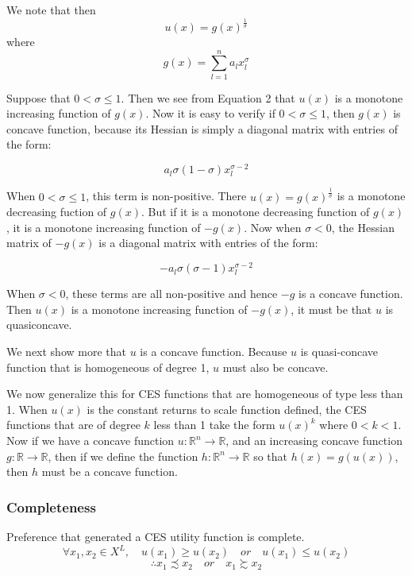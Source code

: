 We note that then
\begin{equation}
u(x)=g(x)^{\frac{1}{\sigma}}
\end{equation}
where
\begin{equation}
g(x)=\sum\limits_{l=1}^{n} a_{l} x_{l}^{\sigma}
\end{equation}

Suppose that $0<\sigma\leq1$. Then we see from Equation 2 that $u(x)$ is a monotone increasing function of $g(x)$. Now it is easy to verify if $0<\sigma\leq1$, then $g(x)$ is concave function, because its Hessian is simply a diagonal matrix with entries of the form:

\begin{equation}
a_{l}\sigma(1-\sigma)x_{l}^{\sigma-2}
\end{equation}

When $0<\sigma\leq1$, this term is non-positive. There $u(x) = g(x)^{\frac{1}{\sigma}}$ is a monotone decreasing fuction of $g(x)$. But if it is a monotone decreasing function of $g(x)$, it is a monotone increasing function of $-g(x)$. Now when $\sigma<0$, the Hessian matrix of $-g(x)$ is a diagonal matrix with entries of the form:

\begin{equation}
-a_{l}\sigma(\sigma-1)x_l^{\sigma-2}
\end{equation}

When $\sigma<0$, these terms are all non-positive and hence $-g$ is a concave function. Then $u(x)$ is a monotone increasing function of $-g(x)$, it must be that $u$ is quasiconcave.

We next show more that $u$ is a concave function. Because $u$ is quasi-concave function that is homogeneous of degree 1, $u$ must also be concave.

We now generalize this for CES functions that are homogeneous of type less than 1. When $u(x)$ is the constant returns to scale function defined, the CES functions that are of degree $k$ less than 1 take the form $u(x)^{k}$ where $0 < k < 1$. Now if we have a concave function $u: \mathbb{R}^{n} \rightarrow \mathbb{R}$, and an increasing concave function $g: \mathbb{R} \rightarrow \mathbb{R}$, then if we define the function $h: \mathbb{R}^n \rightarrow \mathbb{R}$ so that $h(x) = g(u(x))$, then $h$ must be a concave function.

\subsubsection{Completeness}
Preference that generated a CES utility function is complete.
$$\forall x_1, x_2 \in X^L, \quad u(x_1)\geq u(x_2) \quad or \quad u(x_1)\leq u(x_2)$$
$$\therefore x_1 \precsim x_2\quad or \quad x_1 \succsim x_2 $$
